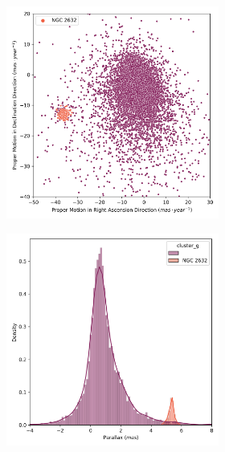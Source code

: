 \documentclass[11pt, a4paper, english]{book}
\begin{document}
\begin{figure}[H]
  \centering
  \begin{subfigure}{0.9\textwidth}
    \centering
    \begin{subfigure}[t]{0.30\textwidth}
      \centering
      \includegraphics[width=\textwidth]{../figures/ngc_2632/pm_ngc_2632.png}
    \end{subfigure}
    \hfill
    \begin{subfigure}[t]{0.30\textwidth}
      \centering
      \includegraphics[width=\textwidth]{../figures/ngc_2632/parallax_ngc_2632.png}

\end{subfigure}
\end{subfigure}
\end{figure}
\end{document}
